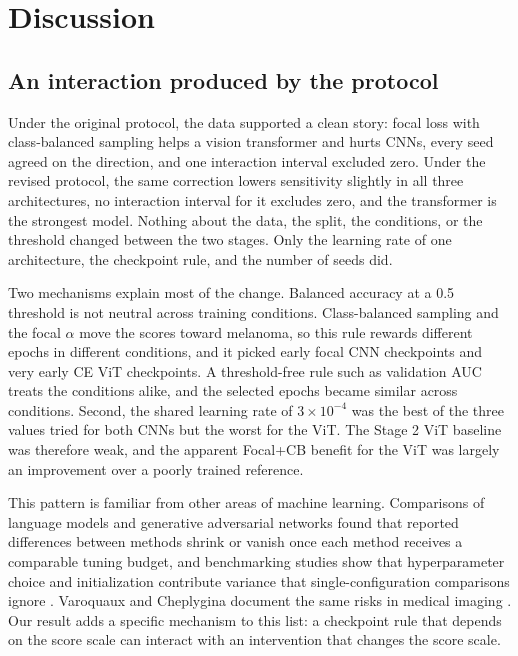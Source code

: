 \section{Discussion}

\subsection{An interaction produced by the protocol}

Under the original protocol, the data supported a clean story: focal loss with class-balanced sampling helps a vision transformer and hurts CNNs, every seed agreed on the direction, and one interaction interval excluded zero. Under the revised protocol, the same correction lowers sensitivity slightly in all three architectures, no interaction interval for it excludes zero, and the transformer is the strongest model. Nothing about the data, the split, the conditions, or the threshold changed between the two stages. Only the learning rate of one architecture, the checkpoint rule, and the number of seeds did.

Two mechanisms explain most of the change. Balanced accuracy at a 0.5 threshold is not neutral across training conditions. Class-balanced sampling and the focal $\alpha$ move the scores toward melanoma, so this rule rewards different epochs in different conditions, and it picked early focal CNN checkpoints and very early CE ViT checkpoints. A threshold-free rule such as validation AUC treats the conditions alike, and the selected epochs became similar across conditions. Second, the shared learning rate of $3\times10^{-4}$ was the best of the three values tried for both CNNs but the worst for the ViT. The Stage 2 ViT baseline was therefore weak, and the apparent Focal+CB benefit for the ViT was largely an improvement over a poorly trained reference.

This pattern is familiar from other areas of machine learning. Comparisons of language models \citep{melis2018evaluation} and generative adversarial networks \citep{lucic2018gans} found that reported differences between methods shrink or vanish once each method receives a comparable tuning budget, and benchmarking studies show that hyperparameter choice and initialization contribute variance that single-configuration comparisons ignore \citep{bouthillier2021variance,dodge2019showyourwork}. Varoquaux and Cheplygina document the same risks in medical imaging \citep{varoquaux2022failures}. Our result adds a specific mechanism to this list: a checkpoint rule that depends on the score scale can interact with an intervention that changes the score scale.

